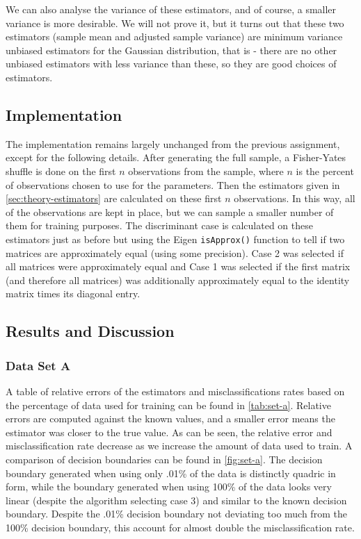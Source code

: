 \documentclass[headings=optiontoheadandtoc,listof=totoc,parskip=full]{scrartcl}
\begin{document}
We can also analyse the variance of these estimators, and of course, a smaller variance is more desirable. We will not prove it, but it turns out that these two estimators (sample mean and adjusted sample variance) are minimum variance unbiased estimators for the Gaussian distribution, that is - there are no other unbiased estimators with less variance than these, so they are good choices of estimators.

\subsection{Implementation}
\label{sec:part-1-impl}

The implementation remains largely unchanged from the previous assignment, except for the following details. After generating the full sample, a Fisher-Yates shuffle is done on the first $n$ observations from the sample, where $n$ is the percent of observations chosen to use for the parameters. Then the estimators given in \cref{sec:theory-estimators} are calculated on these first $n$ observations. In this way, all of the observations are kept in place, but we can sample a smaller number of them for training purposes. The discriminant case is calculated on these estimators just as before but using the Eigen \texttt{isApprox()} function to tell if two matrices are approximately equal (using some precision). Case 2 was selected if all matrices were approximately equal and Case 1 was selected if the first matrix (and therefore all matrices) was additionally approximately equal to the identity matrix times its diagonal entry.

\subsection{Results and Discussion}

\subsubsection{Data Set A}
\label{sec:results-bayes-a}

A table of relative errors of the estimators and misclassifications rates based on the percentage of data used for training can be found in \cref{tab:set-a}. Relative errors are computed against the known values, and a smaller error means the estimator was closer to the true value. As can be seen, the relative error and misclassification rate decrease as we increase the amount of data used to train. A comparison of decision boundaries can be found in \cref{fig:set-a}. The decision boundary generated when using only .01\% of the data is distinctly quadric in form, while the boundary generated when using 100\% of the data looks very linear (despite the algorithm selecting case 3) and similar to the known decision boundary. Despite the .01\% decision boundary not deviating too much from the 100\% decision boundary, this account for almost double the misclassification rate.
\end{document}
